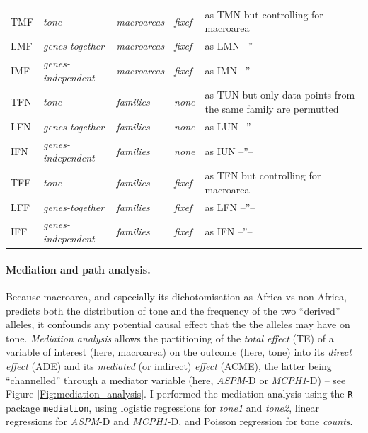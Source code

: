 \documentclass[twoside,twocolumn]{article}
\begin{document}
\begin{table}[h]
\begin{tabularx}{\textwidth}{|l|l|l|l|X|}
    \midrule
    TMF & \textit{tone} & \textit{macroareas} & \textit{fixef} & as TMN but controlling for macroarea \\
    LMF & \textit{genes-together} & \textit{macroareas} & \textit{fixef} & as LMN --''-- \\
    IMF & \textit{genes-independent} & \textit{macroareas} & \textit{fixef} & as IMN --''-- \\
    \midrule
    TFN & \textit{tone} & \textit{families} & \textit{none} & as TUN but only data points from the same family are permutted \\
    LFN & \textit{genes-together} & \textit{families} & \textit{none} & as LUN --''-- \\
    IFN & \textit{genes-independent} & \textit{families} & \textit{none} & as IUN --''-- \\
    \midrule
    TFF & \textit{tone} & \textit{families} & \textit{fixef} & as TFN but controlling for macroarea \\
    LFF & \textit{genes-together} & \textit{families} & \textit{fixef} & as LFN --''-- \\
    IFF & \textit{genes-independent} & \textit{families} & \textit{fixef} & as IFN --''-- \\
    \bottomrule
  \end{tabularx}
\end{table}

\paragraph{Mediation and path analysis.}

Because macroarea, and especially its dichotomisation as Africa vs non-Africa, predicts both the distribution of tone and the frequency of the two ``derived'' alleles, it confounds any potential causal effect that the the alleles may have on tone.
\emph{Mediation analysis} \citep{mackinnon_mediation_2007} allows the partitioning of the \emph{total effect} (TE) of a variable of interest (here, macroarea) on the outcome (here, tone) into its \emph{direct effect} (ADE) and its \emph{mediated} (or indirect) \emph{effect} (ACME), the latter being ``channelled'' through a mediator variable (here, \textit{ASPM}-D or \textit{MCPH1}-D) -- see Figure \ref{Fig:mediation_analysis}.
I performed the mediation analysis using the \texttt{R} package \texttt{mediation}, using logistic regressions for \textit{tone1} and \textit{tone2}, linear regressions for \textit{ASPM}-D and \textit{MCPH1}-D, and Poisson regression for tone \textit{counts}.
\end{document}
